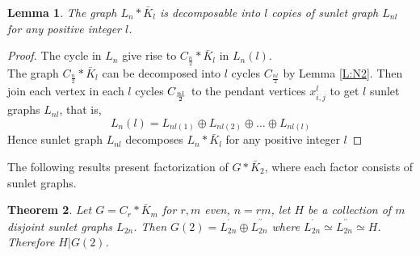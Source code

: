 \documentclass[12pt]{report}
\newtheorem{thm}{Theorem}[section]
\newtheorem{lem}[thm]{Lemma}
\begin{document}
\begin{lem}\label{L:ABQ1}
The graph $L_n*\bar{K}_l$ is decomposable into $l$ copies of sunlet
graph $L_{nl}$ for any positive integer $l$.
\end{lem}
\begin{proof}
The cycle in $L_{n}$ give rise to $C_{\frac{n}{2}}*
\bar{K}_{l}$ in $L_{n}\left( l\right) $.\\
The graph $C_{\frac{n}{2}}*\bar{K}_{l}$ can be decomposed into $l$ cycles $C_{\frac{nl%
}{2}}$ by Lemma \ref{L:N2}. Then join each vertex in each $l$ cycles $C_{%
\frac{nl}{2}}$ to the pendant vertices $x_{i,j}^{l}$ to get $l$
sunlet graphs $L_{nl}$, that is,
$$L_{n}\left( l\right) =L_{nl(1)}\oplus L_{nl(2)}\oplus ...\oplus
L_{nl(l)}$$ Hence sunlet graph $L_{nl}$ decomposes $L_n*\bar{K}_{l} $ for any positive
integer $l$
\end{proof}
The following results present factorization of $G*\bar{K}_{2}$, where each factor consists of sunlet graphs.
\begin{thm}\label{T:N7}
Let $G=C_{r}*\bar{K}_{m}$ for $r,m$ even, $n=rm$, let $H$ be a
collection of $m$ disjoint sunlet graphs $L_{2n}$.  Then $G\left(
2\right) =L_{2n}^{^{\prime }}\oplus L_{2n}^{^{\prime \prime }}$ where $%
L_{2n}^{^{\prime }}\simeq L_{2n}^{^{\prime \prime }}\simeq H$. Therefore $%
H|G\left( 2\right) $.
\end{thm}
\end{document}
